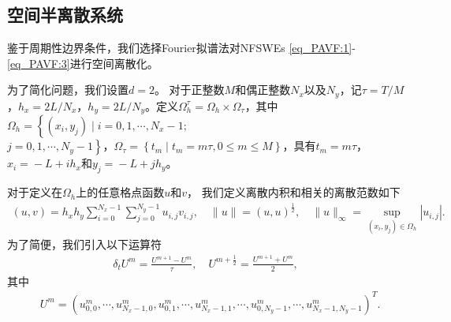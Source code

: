 \subsection{空间半离散系统}

鉴于周期性边界条件，我们选择Fourier拟谱法对NFSWEs \eqref{eq_PAVF:1}-\eqref{eq_PAVF:3}进行空间离散化。

为了简化问题，我们设置$d=2$。
对于正整数$M$和偶正整数$N_{x}$以及$N_{y}$，记$\tau={T}/{M}$，$h_{x}={2 L}/{N_{x}}$，$h_{y}={2 L}/{N_{y}}$。定义$\Omega_{h}^{\tau}=\Omega_{h} \times \Omega_{\tau}$，其中$\Omega_{h}=\left\{\left(x_{i}, y_{j}\right) \mid i=0,1, \cdots, N_{x}\!-\!1;\right.$\\$\left.j=0,1, \cdots, N_{y}\!-\!1\right\}$，$\Omega_{\tau}=\left\{t_{m} \mid t_{m}=m \tau, 0 \leq m \leq M\right\}$，具有$t_{m}=m \tau$，$x_{i}\!=\!-L+i h_{x}$和$y_{j}\!=\!-L+j h_{y}$。

对于定义在$\Omega_h$上的任意格点函数$u$和$v$，
我们定义离散内积和相关的离散范数如下
\begin{align}\label{eq_PAVF:48}
(u, v)=h_{x} h_{y} \sum_{i=0}^{N_{x}-1} \sum_{j=0}^{N_{y}-1} u_{i, j} v_{i, j}, \quad\|u\|=(u, u)^{\frac{1}{2}}, \quad\|u\|_{\infty}=\sup _{\left(x_{i}, y_{j}\right) \in \Omega_{h}}\left|u_{i, j}\right|.
\end{align}
为了简便，我们引入以下运算符
\begin{align}\label{eq_PAVF:49}
\delta_{t} U^{m}=\frac{U^{m+1}-U^{m}}{\tau}, \quad U^{m+\frac{1}{2}}=\frac{U^{m+1}+U^{m}}{2},
\end{align}
其中
\begin{align}\label{eq_PAVF:47}
&U^m=\left(u_{0,0}^m, \cdots, u_{N_{x}-1,0}^m, u_{0,1}^m, \cdots, u_{N_{x}-1,1}^m, \cdots, u_{0, N_{y}-1}^m, \cdots, u_{N_{x}-1, N_{y}-1}^m\right)^{T}. %
\end{align}


